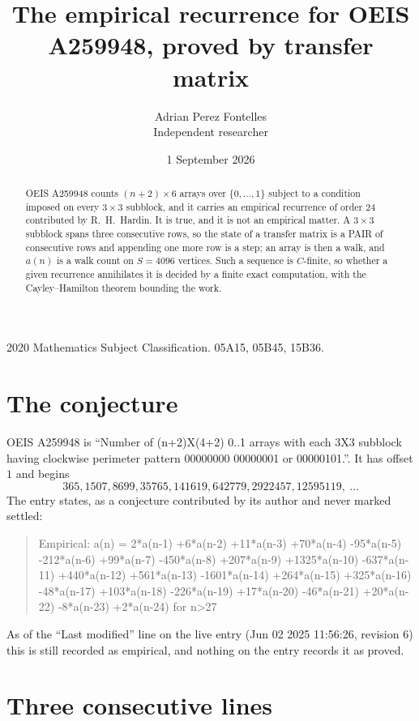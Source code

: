 \documentclass[11pt,a4paper]{article}
\title{The empirical recurrence for OEIS A259948, proved by transfer matrix}
\author{Adrian Perez Fontelles\\ \small Independent researcher}
\date{1 September 2026}
\theoremstyle{plain}
\theoremstyle{definition}
\begin{document}
\maketitle

\begin{abstract}
OEIS A259948 counts $(n+2)\times6$ arrays over $\{0,\dots,1\}$ subject to a condition imposed on
every $3\times3$ subblock, and it carries an empirical recurrence of order $24$
contributed by R.~H.~Hardin. It is true, and it is not an empirical matter. A $3\times3$
subblock spans three consecutive rows, so the state of a transfer matrix is a PAIR of
consecutive rows and appending one more row is a step; an array is then a walk, and
$a(n)$ is a walk count on $S=4096$ vertices. Such a sequence is $C$-finite, so whether a given
recurrence annihilates it is decided by a finite exact computation, with the Cayley--Hamilton
theorem bounding the work.
\end{abstract}

\noindent\small 2020 Mathematics Subject Classification. 05A15, 05B45, 15B36.\normalsize

\section{The conjecture}

OEIS A259948 is ``Number of (n+2)X(4+2) 0..1 arrays with each 3X3 subblock having clockwise perimeter pattern 00000000 00000001 or 00000101.''. It has offset $1$ and begins
\[
365, 1507, 8699, 35765, 141619, 642779, 2922457, 12595119,\ \dots
\]
The entry states, as a conjecture contributed by its author and never marked settled:
\begin{quote}
Empirical: a(n) = 2*a(n-1) +6*a(n-2) +11*a(n-3) +70*a(n-4) -95*a(n-5) -212*a(n-6) +99*a(n-7) -450*a(n-8) +207*a(n-9) +1325*a(n-10) -637*a(n-11) +440*a(n-12) +561*a(n-13) -1601*a(n-14) +264*a(n-15) +325*a(n-16) -48*a(n-17) +103*a(n-18) -226*a(n-19) +17*a(n-20) -46*a(n-21) +20*a(n-22) -8*a(n-23) +2*a(n-24) for n>27
\end{quote}
As of the ``Last modified'' line on the live entry (Jun 02 2025 11:56:26, revision 6) this is still
recorded as empirical, and nothing on the entry records it as proved.

\section{Three consecutive lines}
\end{document}
